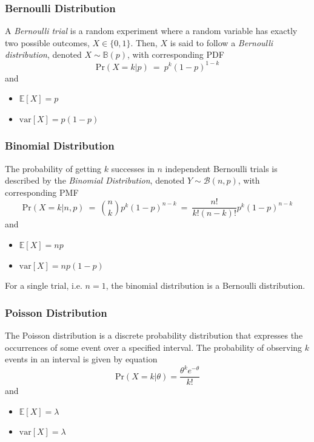 \documentclass[11pt]{article}
\theoremstyle{plain}
\theoremstyle{definition}
\begin{document}
\subsubsection{Bernoulli Distribution}
A \textit{Bernoulli trial} is a random experiment where a random variable has exactly two possible outcomes, $X \in \{0,1\}$. Then, $X$ is said to follow a \textit{Bernoulli distribution}, denoted $X \sim \mathbb{B}(p)$,  with corresponding PDF
\begin{equation}
\text{Pr}(X=k|p) \ = \ p^k(1-p)^{1-k}
\end{equation}
and
\begin{itemize}
	\item $\mathbb{E}[X] = p$
	\item $\text{var}[X] = p(1-p)$
\end{itemize}

\subsubsection{Binomial Distribution}
The probability of getting $k$ successes in $n$ independent Bernoulli trials is described by the \textit{Binomial Distribution}, denoted $Y \sim \mathcal{B}(n,p)$, with corresponding PMF
\begin{equation}
\text{Pr}(X=k|n,p) \ = \ \binom{n}{k}p^k(1-p)^{n-k} \ = \ \frac{n!}{k!(n-k)!} p^k(1-p)^{n-k}
\end{equation}
and
\begin{itemize}
	\item $\mathbb{E}[X] = np$
	\item $\text{var}[X] = np(1-p)$
\end{itemize}
For a single trial, i.e. $n=1$, the binomial distribution is a Bernoulli distribution.

\subsubsection{Poisson Distribution}
The Poisson distribution is a discrete probability distribution that expresses the occurrences of some event over a specified interval. The probability of observing $k$ events in an interval is given by equation
\begin{equation}
\text{Pr}(X=k|\theta) = \frac{\theta^k e^{-\theta}}{k!}
\end{equation}
and
\begin{itemize}
	\item $\mathbb{E}[X] = \lambda$
	\item $\text{var}[X] = \lambda$
\end{itemize}
\end{document}
